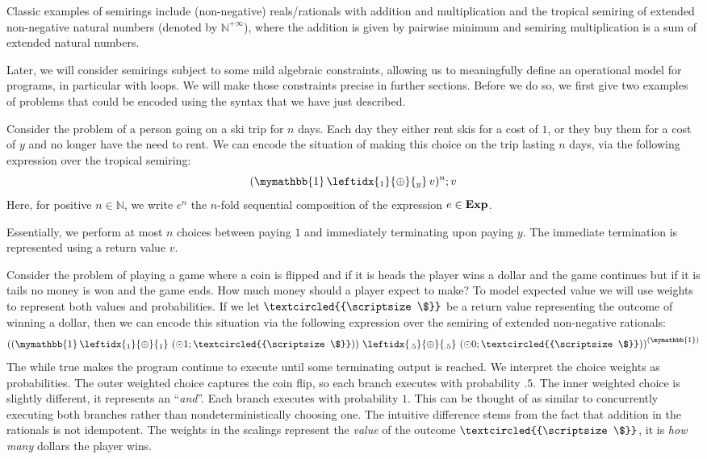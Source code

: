 \documentclass[a4paper,UKenglish,cleveref, autoref, thm-restate]{lipics-v2021}
\newcommand{\Exp}{\textbf{\upshape{Exp}}}
\newcommand{\WC}[2]{\,\leftidx{_{#1}}{{\oplus}}{_{#2}}\,}
\newcommand{\bskip}{\mymathbb{1}}
\newcommand{\wgkat}{\textsf{\upshape{wGKAT}}\xspace}
\newcommand{\coin}{\textcircled{{\scriptsize \$}}}
\newcommand{\exN}{\mathbb{N}^{+\infty}}
\theoremstyle{plain}\newtheoremrep{thm}{Theorem}[section]
\begin{document}
		Classic examples of semirings include (non-negative) reals/rationals with addition and multiplication and the tropical semiring of extended non-negative natural numbers (denoted by $\exN$), where the addition is given by pairwise minimum and semiring multiplication is a sum of extended natural numbers.
		
		Later, we will consider semirings subject to some mild algebraic constraints, allowing us to meaningfully define an operational model for \wgkat programs, in particular with loops. We will make those constraints precise in further sections. Before we do so, we first give two examples of problems that could be encoded using the syntax that we have just described.
		
		\begin{exmp}
			Consider the problem of a person going on a ski trip for $n$ days. Each day they either rent skis for a cost of $1$, or they buy them for a cost of $y$ and no longer have the need to rent. We can encode the situation of making this choice on the trip lasting $n$ days, via the following \wgkat expression over the tropical semiring:
			$$(\bskip \WC{1}{y} v)^n;v$$
			Here, for positive $n \in \mathbb{N}$, we write $e^n$ the $n$-fold sequential composition of the expression $e \in \Exp$. 
			
			Essentially, we perform at most $n$ choices between paying $1$ and immediately terminating upon paying $y$. The immediate termination is represented using a return value $v$. \label{ski1}
		\end{exmp}
		\begin{exmp}
			Consider the problem of playing a game where a coin is flipped and if it is heads the player wins a dollar and the game continues but if it is tails no money is won and the game ends. How much money should a player expect to make? To model expected value we will use weights to represent both values and probabilities. If we let $\coin$ be a return value representing the outcome of winning a dollar, then we can encode this situation via the following \wgkat expression over the semiring of extended non-negative rationals:
			$$\left( \left(\bskip \WC{1}{1} \left(\odot 1;\coin \right)\right) \WC{.5}{.5} \left(\odot 0;\coin\right)\right)^{(\bskip)}$$
			The while true makes the program continue to execute until some terminating output is reached. We interpret the choice weights as probabilities. The outer weighted choice captures the coin flip, so each branch executes with probability $.5$. The inner weighted choice is slightly different, it represents an ``\textit{and}''. Each branch executes with probability $1$. This can be thought of as similar to concurrently executing both branches rather than nondeterministically choosing one. The intuitive difference stems from the fact that addition in the rationals is not idempotent. The weights in the scalings represent the \emph{value} of the outcome $\coin$, it is \emph{how many} dollars the player wins. \label{coin1}
		\end{exmp}
\end{document}

